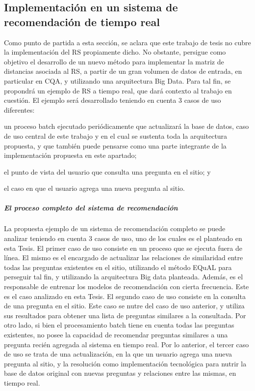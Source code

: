 \subsection{Implementación en un sistema de recomendación de tiempo real}

Como punto de partida a esta sección, se aclara que este trabajo de tesis no cubre la implementación del RS propiamente dicho. No obstante, persigue como objetivo el desarrollo de un nuevo método para implementar la matriz de distancias asociada al RS, a partir de un gran volumen de datos de entrada, en particular en CQA, y utilizando una arquitectura Big Data. Para tal fin, se propondrá un ejemplo de RS a tiempo real, que dará contexto al trabajo en cuestión. El ejemplo será desarrollado teniendo en cuenta 3 casos de uso diferentes: \begin{enumerate*} [label=(\roman*)] \item un proceso batch ejecutado periódicamente que actualizará la base de datos, caso de uso central de este trabajo y en el cual se sustenta toda la arquitectura propuesta, y que también puede pensarse como una parte integrante de la implementación propuesta en este apartado; \item el punto de vista del usuario que consulta una pregunta en el sitio; y \item el caso en que el usuario agrega una nueva pregunta al sitio.\end{enumerate*}

\subparagraph{El proceso completo del sistema de recomendación}
La propuesta ejemplo de un sistema de recomendación completo se puede analizar teniendo en cuenta 3 casos de uso, uno de los cuales es el planteado en esta Tesis.
\bigskip El primer caso de uso consiste en un proceso que se ejecuta fuera de línea. El mismo es el encargado de actualizar las relaciones de similaridad entre todas las preguntas existentes en el sitio, utilizando el método EQuAL para perseguir tal fin, y utilizando la arquitectura Big data planteada. Además, es el responsable de entrenar los modelos de recomendación con cierta frecuencia. Este es el caso analizado en esta Tesis. El segundo caso de uso consiste en la consulta de una pregunta en el sitio. Este caso se nutre del caso de uso anterior, y utiliza sus resultados para obtener una lista de preguntas similares a la consultada. Por otro lado, si bien el procesamiento batch tiene en cuenta todas las preguntas existentes, no posee la capacidad de recomendar preguntas similares a una pregunta recién agregada al sistema en tiempo real. Por lo anterior, el tercer caso de uso se trata de una actualización, en la que un usuario agrega una nueva pregunta al sitio, y la resolución como implementación tecnológica para nutrir la base de datos original con nuevas preguntas y relaciones entre las mismas, en tiempo real.


